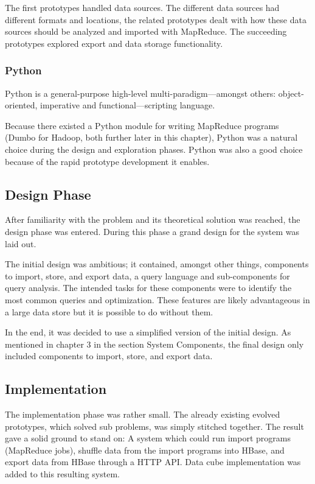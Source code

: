 The first prototypes handled data sources. The different data sources had
different formats and locations, the related prototypes dealt with how these
data sources should be analyzed and imported with MapReduce. The succeeding
prototypes explored export and data storage functionality.


\subsubsection{Python}

Python is a general-purpose high-level multi-paradigm---amongst others:
object-oriented, imperative and functional---scripting language. \cite{python}

Because there existed a Python module for writing MapReduce programs (Dumbo for
Hadoop, both further later in this chapter), Python was a natural choice during
the design and exploration phases. Python was also a good choice because of the
rapid prototype development it enables.


\subsection*{Design Phase}

After familiarity with the problem and its theoretical solution was reached,
the design phase was entered. During this phase a grand design for the system
was laid out.

The initial design was ambitious; it contained, amongst other things, components
to import, store, and export data, a query language and sub-components for
query analysis. The intended tasks for these components were to identify the
most common queries and optimization. These features are likely advantageous in
a large data store but it is possible to do without them.

In the end, it was decided to use a simplified version of the initial design.
As mentioned in chapter 3 in the section System Components, the final design
only included components to import, store, and export data.


\subsection*{Implementation}

The implementation phase was rather small. The already existing evolved
prototypes, which solved sub problems, was simply stitched together. The result
gave a solid ground to stand on: A system which could run import programs
(MapReduce jobs), shuffle data from the import programs into HBase, and export
data from HBase through a HTTP API. Data cube implementation was added to this
resulting system.


